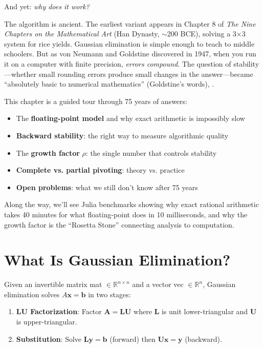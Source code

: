 And yet: \emph{why does it work?}

The algorithm is ancient. The earliest variant appears in Chapter 8 of \textit{The Nine Chapters on the Mathematical Art} (Han Dynasty, $\sim$200 BCE), solving a 3×3 system for rice yields. Gaussian elimination is simple enough to teach to middle schoolers. But as von Neumann and Goldstine discovered in 1947, when you run it on a computer with finite precision, \emph{errors compound}. The question of stability---whether small rounding errors produce small changes in the answer---became ``absolutely basic to numerical mathematics'' (Goldstine's words), \cite{urschel2025numerical}.

This chapter is a guided tour through 75 years of answers:
\begin{itemize}
    \item The \textbf{floating-point model} and why exact arithmetic is impossibly slow
    \item \textbf{Backward stability}: the right way to measure algorithmic quality
    \item The \textbf{growth factor} $\rho$: the single number that controls stability
    \item \textbf{Complete vs. partial pivoting}: theory vs. practice
    \item \textbf{Open problems}: what we still don't know after 75 years
\end{itemize}

Along the way, we'll see Julia benchmarks showing why exact rational arithmetic takes 40 minutes for what floating-point does in 10 milliseconds, and why the growth factor is the ``Rosetta Stone'' connecting analysis to computation.

\section{What Is Gaussian Elimination?}
\label{sec:ge:algorithm}

Given an invertible matrix \gls{mat} $\in \mathbb{R}^{n\times n}$ and a vector \gls{vec} $\in \mathbb{R}^n$, Gaussian elimination solves $A\mathbf{x} = \mathbf{b}$ in two stages:

\begin{enumerate}
    \item \textbf{LU Factorization}: Factor $\bm{A} = \bm{L}\bm{U}$ where $\bm{L}$ is unit lower-triangular and $\bm{U}$ is upper-triangular.
    \item \textbf{Substitution}: Solve $\bm{L}\bm{y} = \bm{b}$ (forward) then $\bm{U}\bm{x} = \bm{y}$ (backward).
\end{enumerate}

